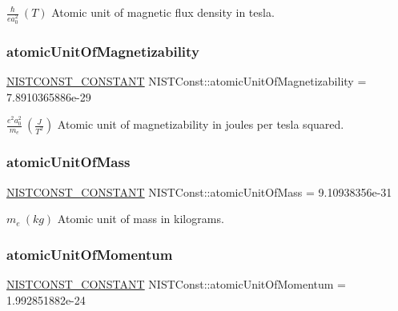 $\frac{\hbar}{e a_0^2} \ (T)$ Atomic unit of magnetic flux density in tesla. \mbox{\label{group___n_i_s_t_const-_atomic_unit_ga20e7e2a56b476e5730ce9c59a4efc946}} 
\subsubsection{\texorpdfstring{atomic\+Unit\+Of\+Magnetizability}{atomicUnitOfMagnetizability}}
{\footnotesize\ttfamily \mbox{\hyperlink{group___n_i_s_t_const-_macros_ga2b0fc1d7452373f816175dd86ce26729}{N\+I\+S\+T\+C\+O\+N\+S\+T\+\_\+\+C\+O\+N\+S\+T\+A\+NT}} N\+I\+S\+T\+Const\+::atomic\+Unit\+Of\+Magnetizability = 7.\+8910365886e-\/29}

$\frac{e^2a_0^2}{m_e} \ (\frac{J}{T^2})$ Atomic unit of magnetizability in joules per tesla squared. \mbox{\label{group___n_i_s_t_const-_atomic_unit_gaffbb7b29a9d92b540321f074f46903ae}} 
\subsubsection{\texorpdfstring{atomic\+Unit\+Of\+Mass}{atomicUnitOfMass}}
{\footnotesize\ttfamily \mbox{\hyperlink{group___n_i_s_t_const-_macros_ga2b0fc1d7452373f816175dd86ce26729}{N\+I\+S\+T\+C\+O\+N\+S\+T\+\_\+\+C\+O\+N\+S\+T\+A\+NT}} N\+I\+S\+T\+Const\+::atomic\+Unit\+Of\+Mass = 9.\+10938356e-\/31}

$m_e \ (kg)$ Atomic unit of mass in kilograms. \mbox{\label{group___n_i_s_t_const-_atomic_unit_ga3a2d8ad829da0868381d6f31817ed453}} 
\subsubsection{\texorpdfstring{atomic\+Unit\+Of\+Momentum}{atomicUnitOfMomentum}}
{\footnotesize\ttfamily \mbox{\hyperlink{group___n_i_s_t_const-_macros_ga2b0fc1d7452373f816175dd86ce26729}{N\+I\+S\+T\+C\+O\+N\+S\+T\+\_\+\+C\+O\+N\+S\+T\+A\+NT}} N\+I\+S\+T\+Const\+::atomic\+Unit\+Of\+Momentum = 1.\+992851882e-\/24}

